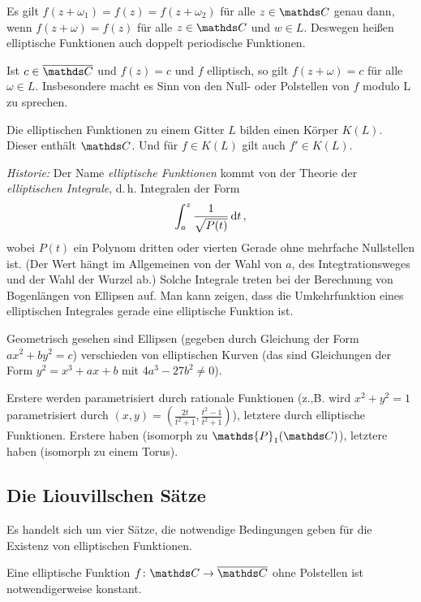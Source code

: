 \begin{beme-list}
\item Es gilt $f(z+\omega_1) = f(z) = f(z+\omega_2)$ für alle $z\in\CC$ genau dann, wenn $f(z+\omega) = f(z)$ für alle $z\in\CC$ und $w\in L$.
Deswegen heißen elliptische Funktionen auch doppelt periodische Funktionen.

\item Ist $c\in\closure\CC$ und $f(z) = c$ und $f$ elliptisch, so gilt $f(z+\omega) = c$ für alle $\omega \in L$.
Insbesondere macht es Sinn von den Null- oder Polstellen von $f$ modulo L zu sprechen.

\item Die elliptischen Funktionen zu einem Gitter $L$ bilden einen Körper $K(L)$. Dieser enthält $\CC$. Und für $f\in K(L)$ gilt auch $f'\in K(L)$.

\item \emph{Historie:} Der Name \emph{elliptische Funktionen} kommt von der Theorie der \emph{elliptischen Integrale}, d.\,h. Integralen der Form 
\[
	\int_a^z \frac{1}{\sqrt{P(t)}} \,\mathrm{d} t
	\,,
\]
wobei $P(t)$ ein Polynom dritten oder vierten Gerade ohne mehrfache Nullstellen ist.
(Der Wert hängt im Allgemeinen von der Wahl von $a$, des Integtrationsweges und der Wahl der Wurzel ab.)
Solche Integrale treten bei der Berechnung von Bogenlängen von Ellipsen auf.
Man kann zeigen, dass die Umkehrfunktion eines elliptischen Integrales gerade eine elliptische Funktion ist.

Geometrisch gesehen sind Ellipsen (gegeben durch Gleichung der Form $ax^2+by^2 = c$) verschieden von elliptischen Kurven (das sind Gleichungen der Form $y^2 = x^3+ax+b$ mit $4a^3 - 27b^2 \not= 0$).

Erstere werden parametrisiert durch rationale Funktionen (z.,B. wird $x^2+y^2 = 1$ parametrisiert durch $(x, y) = (\frac{2t}{t^2+1}, \frac{t^2-1}{t^2+1})$), letztere durch elliptische Funktionen.
Erstere haben  (isomorph zu $\mathds{P}_1(\CC)$), letztere haben  (isomorph zu einem Torus).
\end{beme-list}

\subsection{Die Liouvillschen Sätze}

Es handelt sich um vier Sätze, die notwendige Bedingungen geben für die Existenz von elliptischen Funktionen.

\begin{satz}\label{satz:liouville-1}
Eine elliptische Funktion $f\colon \CC \ra \closure \CC$ ohne Polstellen ist notwendigerweise konstant.
\end{satz}

